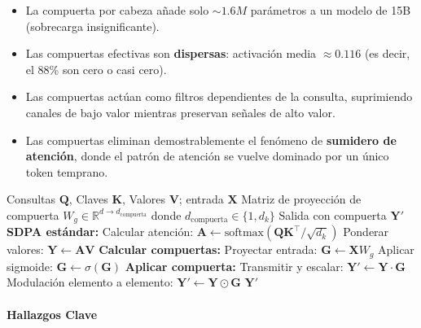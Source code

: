 \begin{itemize}[leftmargin=*]
    \item La compuerta por cabeza añade solo $\sim 1.6M$ parámetros a un modelo de 15B (sobrecarga insignificante).
    \item Las compuertas efectivas son \textbf{dispersas}: activación media $\approx 0.116$ (es decir, el 88\% son cero o casi cero).
    \item Las compuertas actúan como filtros dependientes de la consulta, suprimiendo canales de bajo valor mientras preservan señales de alto valor.
    \item Las compuertas eliminan demostrablemente el fenómeno de \textbf{sumidero de atención}, donde el patrón de atención se vuelve dominado por un único token temprano.
\end{itemize}

\begin{algorithm}[H]
\caption{Atención Softmax con Compuerta (Post-SDPA)}
\begin{algorithmic}[1]
\Require Consultas $\mathbf{Q}$, Claves $\mathbf{K}$, Valores $\mathbf{V}$; entrada $\mathbf{X}$
\Require Matriz de proyección de compuerta $W_g \in \mathbb{R}^{d \to d_{\text{compuerta}}}$ donde $d_{\text{compuerta}} \in \{1, d_k\}$
\Ensure Salida con compuerta $\mathbf{Y}'$
\State \textbf{SDPA estándar:}
\State Calcular atención: $\mathbf{A} \gets \text{softmax}(\mathbf{Q}\mathbf{K}^\top / \sqrt{d_k})$ 
\State Ponderar valores: $\mathbf{Y} \gets \mathbf{A} \mathbf{V}$
\State \textbf{Calcular compuertas:}
\State Proyectar entrada: $\mathbf{G} \gets \mathbf{X} W_g$  
\State Aplicar sigmoide: $\mathbf{G} \gets \sigma(\mathbf{G})$ 
\State \textbf{Aplicar compuerta:}
    \State Transmitir y escalar: $\mathbf{Y}' \gets \mathbf{Y} \cdot \mathbf{G}$ 
\Else
    \State Modulación elemento a elemento: $\mathbf{Y}' \gets \mathbf{Y} \odot \mathbf{G}$ 
\EndIf
\Return $\mathbf{Y}'$
\end{algorithmic}
\end{algorithm}

\paragraph{Hallazgos Clave}

